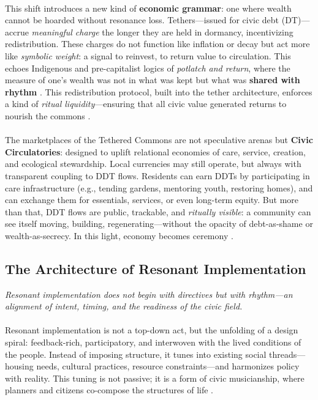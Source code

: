 \documentclass[12pt]{article}
\begin{document}
\paragraph{}This shift introduces a new kind of \textbf{economic grammar}: one where wealth cannot be hoarded without resonance loss. Tethers—issued for civic debt (DT)—accrue \textit{meaningful charge} the longer they are held in dormancy, incentivizing redistribution. These charges do not function like inflation or decay but act more like \textit{symbolic weight}: a signal to reinvest, to return value to circulation. This echoes Indigenous and pre-capitalist logics of \textit{potlatch and return}, where the measure of one’s wealth was not in what was kept but what was \textbf{shared with rhythm} \cite{sahlins1972stone,graeber2011debt}. This redistribution protocol, built into the tether architecture, enforces a kind of \textit{ritual liquidity}—ensuring that all civic value generated returns to nourish the commons \cite{rose1992inalienable}.

\paragraph{}The marketplaces of the Tethered Commons are not speculative arenas but \textbf{Civic Circulatories}: designed to uplift relational economies of care, service, creation, and ecological stewardship. Local currencies may still operate, but always with transparent coupling to DDT flows. Residents can earn DDTs by participating in care infrastructure (e.g., tending gardens, mentoring youth, restoring homes), and can exchange them for essentials, services, or even long-term equity. But more than that, DDT flows are public, trackable, and \textit{ritually visible}: a community can see itself moving, building, regenerating—without the opacity of debt-as-shame or wealth-as-secrecy. In this light, economy becomes ceremony \cite{ahmed2004cultural,coates2015between}.

\subsection{The Architecture of Resonant Implementation}

\textit{Resonant implementation does not begin with directives but with rhythm—an alignment of intent, timing, and the readiness of the civic field.}

\paragraph{}Resonant implementation is not a top-down act, but the unfolding of a design spiral: feedback-rich, participatory, and interwoven with the lived conditions of the people. Instead of imposing structure, it tunes into existing social threads—housing needs, cultural practices, resource constraints—and harmonizes policy with reality. This tuning is not passive; it is a form of civic musicianship, where planners and citizens co-compose the structures of life \cite{hooks1994teaching,young1990justice}.
\end{document}
